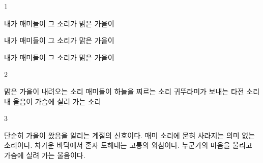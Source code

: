 \documentclass[fs9,seriesFre]{korfarm-base}
\begin{document}
\kfActivityBg \par{}
\par{}\par\nopagebreak[4]\smallskip\nopagebreak[4]
\kfBeginMC
\begin{kfSentenceUnit}{1}{}
\begin{kfChoices}
\kfChoice 내가
\kfChoice 매미들이
\kfChoice 그 소리가
\kfChoice 맑은 가을이
\end{kfChoices}
\begin{kfChoices}
\kfChoice 내가
\kfChoice 매미들이
\kfChoice 그 소리가
\kfChoice 맑은 가을이
\end{kfChoices}
\begin{kfChoices}
\kfChoice 내가
\kfChoice 매미들이
\kfChoice 그 소리가
\kfChoice 맑은 가을이
\end{kfChoices}
\end{kfSentenceUnit}

\begin{kfSentenceUnit}{2}{}
\begin{kfChoices}
\kfChoice 맑은 가을이 내려오는 소리
\kfChoice 매미들이 하늘을 찌르는 소리
\kfChoice 귀뚜라미가 보내는 타전 소리
\kfChoice 내 울음이 가슴에 실려 가는 소리
\end{kfChoices}
\end{kfSentenceUnit}

\begin{kfSentenceUnit}{3}{}
\begin{kfChoices}
\kfChoice 단순히 가을이 왔음을 알리는 계절의 신호이다.
\kfChoice 매미 소리에 묻혀 사라지는 의미 없는 소리이다.
\kfChoice 차가운 바닥에서 혼자 토해내는 고통의 외침이다.
\kfChoice 누군가의 마음을 울리고 가슴에 실려 가는 울음이다.
\end{kfChoices}
\end{kfSentenceUnit}

\kfEndMC

\end{document}
